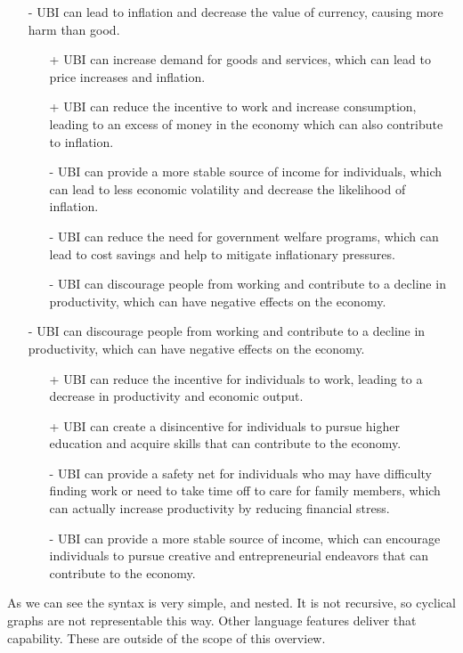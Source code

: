 \documentclass{report}
\begin{document}
\begin{enumerate}
\begin{itemize}
  \item[-] UBI can lead to inflation and decrease the value of currency, causing more harm than good.
  \begin{itemize}
      \item[+] UBI can increase demand for goods and services, which can lead to price increases and inflation.
      \item[+] UBI can reduce the incentive to work and increase consumption, leading to an excess of money in the economy which can also contribute to inflation.
      \item[-] UBI can provide a more stable source of income for individuals, which can lead to less economic volatility and decrease the likelihood of inflation.
      \item[-] UBI can reduce the need for government welfare programs, which can lead to cost savings and help to mitigate inflationary pressures.
      \item[-] UBI can discourage people from working and contribute to a decline in productivity, which can have negative effects on the economy.
  \end{itemize}

  \item[-] UBI can discourage people from working and contribute to a decline in productivity, which can have negative effects on the economy.
  \begin{itemize}
      \item[+] UBI can reduce the incentive for individuals to work, leading to a decrease in productivity and economic output.
      \item[+] UBI can create a disincentive for individuals to pursue higher education and acquire skills that can contribute to the economy.
      \item[-] UBI can provide a safety net for individuals who may have difficulty finding work or need to take time off to care for family members, which can actually increase productivity by reducing financial stress.
      \item[-] UBI can provide a more stable source of income, which can encourage individuals to pursue creative and entrepreneurial endeavors that can contribute to the economy.
  \end{itemize}

  \end{itemize}
\end{enumerate}

As we can see the syntax is very simple, and nested. It is not recursive, so cyclical graphs are not representable this way. Other language features deliver that capability.
These are outside of the scope of this overview.
\end{document}
